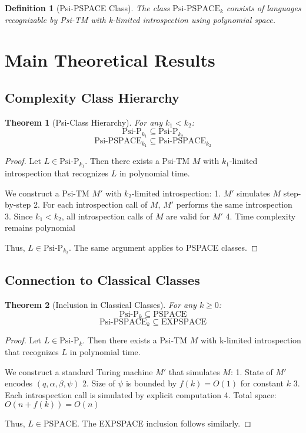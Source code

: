 \documentclass[11pt]{article}
\newtheorem{definition}{Definition}
\newtheorem{theorem}{Theorem}
\begin{document}
\begin{definition}[Psi-PSPACE Class]
The class $\text{Psi-PSPACE}_k$ consists of languages recognizable by Psi-TM with k-limited introspection using polynomial space.
\end{definition}

\section{Main Theoretical Results}

\subsection{Complexity Class Hierarchy}

\begin{theorem}[Psi-Class Hierarchy]
For any $k_1 < k_2$:
$$\text{Psi-P}_{k_1} \subseteq \text{Psi-P}_{k_2}$$
$$\text{Psi-PSPACE}_{k_1} \subseteq \text{Psi-PSPACE}_{k_2}$$
\end{theorem}

\begin{proof}
Let $L \in \text{Psi-P}_{k_1}$. Then there exists a Psi-TM $M$ with $k_1$-limited introspection that recognizes $L$ in polynomial time.

We construct a Psi-TM $M'$ with $k_2$-limited introspection:
1. $M'$ simulates $M$ step-by-step
2. For each introspection call of $M$, $M'$ performs the same introspection
3. Since $k_1 < k_2$, all introspection calls of $M$ are valid for $M'$
4. Time complexity remains polynomial

Thus, $L \in \text{Psi-P}_{k_2}$. The same argument applies to PSPACE classes.
\end{proof}

\subsection{Connection to Classical Classes}

\begin{theorem}[Inclusion in Classical Classes]
For any $k \geq 0$:
$$\text{Psi-P}_k \subseteq \text{PSPACE}$$
$$\text{Psi-PSPACE}_k \subseteq \text{EXPSPACE}$$
\end{theorem}

\begin{proof}
Let $L \in \text{Psi-P}_k$. Then there exists a Psi-TM $M$ with k-limited introspection that recognizes $L$ in polynomial time.

We construct a standard Turing machine $M'$ that simulates $M$:
1. State of $M'$ encodes $(q, \alpha, \beta, \psi)$
2. Size of $\psi$ is bounded by $f(k) = O(1)$ for constant $k$
3. Each introspection call is simulated by explicit computation
4. Total space: $O(n + f(k)) = O(n)$

Thus, $L \in \text{PSPACE}$. The EXPSPACE inclusion follows similarly.
\end{proof}
\end{document}
